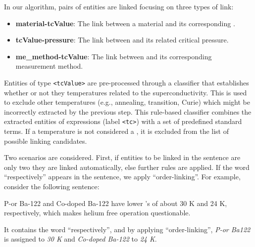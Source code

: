 In our algorithm, pairs of entities are linked focusing on three types of link:
\begin{itemize}
    \item \textbf{material-tcValue}: The link between a material and its corresponding \tc.
    \item \textbf{tcValue-pressure}: The link between \tc and its related critical pressure.
    \item \textbf{me\_method-tcValue}: The link between \tc and its corresponding measurement method.
\end{itemize}

Entities of type \texttt{<tcValue>} are pre-processed through a classifier that establishes whether or not they temperatures related to the superconductivity. This is used to exclude other temperatures (e.g., annealing, transition, Curie) which might be incorrectly extracted by the previous step.
This rule-based classifier combines the extracted entities of \tc expressions (label \texttt{<tc>}) with a set of predefined standard terms.
If a temperature is not considered a \tc, it is excluded from the list of possible linking candidates.

Two scenarios are considered. First, if entities to be linked in the sentence are only two they are linked automatically, else further rules are applied. 
If the word ``respectively'' appears in the sentence, we apply ``order-linking''. 
For example, consider the following sentence:
\begin{displayquote}
    P-or Ba-122  and Co-doped Ba-122 have lower \tc's of about 30 K and 24 K, respectively, which makes helium free operation questionable.
\end{displayquote}
It contains the word ``respectively'', and by applying ``order-linking'', \textit{P-or Ba122} is assigned to \textit{30 K} and \textit{Co-doped Ba-122} to \textit{24 K}.

